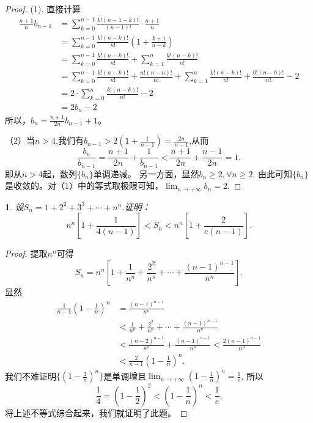 \documentclass[utf8]{book}
\newtheorem{example}{}[section]             %
\begin{document}
\begin{proof}
(1). 直接计算
\begin{equation*}
\begin{split}
\frac{n+1}{n}b_{n-1}&=\displaystyle\sum_{k=0}^{n-1}\frac{k!(n-1-k)!}{(n-1)!}\cdot\frac{n+1}{n}\\
&=\displaystyle\sum_{k=0}^{n-1}\frac{k!(n-k)!}{n!}\left(1 + \frac{k+1}{n-k}\right)\\
&=\displaystyle\sum_{k=0}^{n-1}\frac{k!(n-k)!}{n!} + \displaystyle\sum_{k=1}^{n}\frac{k!(n-k)!}{n!}\\
&=\displaystyle\sum_{k=0}^{n-1}\frac{k!(n-k)!}{n!} + \frac{n!(n-n)!}{n!} + \displaystyle\sum_{k=1}^{n}\frac{k!(n-k)!}{n!} + \frac{0!(n-0)!}{n!} -2\\
&=2\cdot\displaystyle\sum_{k=0}^{n}\frac{k!(n-k)!}{n!} - 2\\
&=2b_n - 2
\end{split}
\end{equation*}
所以，$b_n=\displaystyle\frac{n+1}{2n}b_{n-1} + 1$。

（2）当$n > 4$,我们有$b_{n-1} > 2\left(1 + \frac{1}{n-1}\right) = \frac{2n}{n-1}$,从而
$$\frac{b_n}{b_{n-1}} = \frac{n+1}{2n} + \frac{1}{b_{n-1}} < \frac{n+1}{2n} + \frac{n-1}{2n} = 1.$$
即从$n > 4$起，数列$\{b_n\}$单调递减。
另一方面，显然$b_n \geq 2, \forall n \geq 2$.
由此可知$\{b_n\}$是收敛的。对（1）中的等式取极限可知，$\displaystyle\lim_{n\to +\infty}b_n = 2$.
\end{proof}
\begin{example}
设$S_n=1+2^2+3^3+\cdots+n^n$.证明：
$$n^n\left[1+\frac{1}{4(n-1)}\right] < S_n < n^n\left[1+\frac{2}{e(n-1)}\right].$$
\end{example}
\begin{proof}
提取$n^n$可得
$$S_n = n^n\left[1 + \frac{1}{n^n} + \frac{2^2}{n^n}+\cdots + \frac{(n-1)^{n-1}}{n^n}\right].$$
显然
\begin{equation*}
\begin{split}
\frac{1}{n-1}\left(1-\frac{1}{n}\right)^n &= \frac{(n-1)^{n-1}}{n^n} \\ &< \frac{1}{n^n} + \frac{2^2}{n^n}+\cdots + \frac{(n-1)^{n-1}}{n^n} \\
&< \frac{(n-2)^{n-1}}{n^n} + \frac{(n-1)^{n-1}}{n^n} < \frac{2(n-1)^{n-1}}{n^n}\\
&<\frac{2}{n-1}\left(1-\frac{1}{n}\right)^n.
\end{split}
\end{equation*}
我们不难证明$\{\left(1-\frac{1}{n}\right)^n\}$是单调增且$\displaystyle\lim_{n\to +\infty}\left(1-\frac{1}{n}\right)^n = \frac{1}{e}$. 所以
$$\frac{1}{4}=\left(1-\frac{1}{2}\right)^2 < \left(1-\frac{1}{n}\right)^n < \frac{1}{e}.$$
将上述不等式综合起来，我们就证明了此题。
\end{proof}
\end{document}
